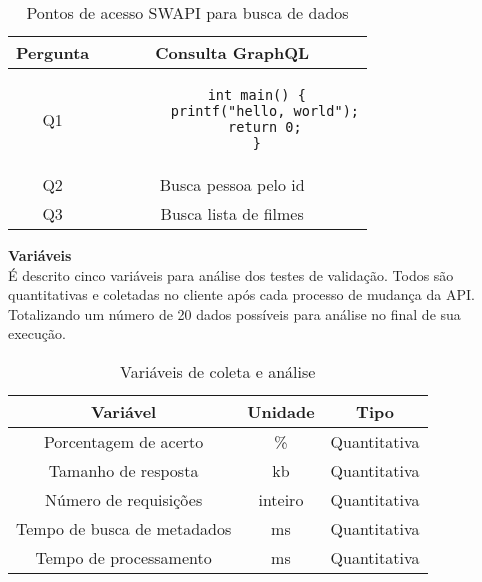\begin{table}[H]
  \centering
  \begin{tabular}{|c|c|}
    \hline
    Pergunta & Consulta GraphQL \\
    \hline
    Q1 & \begin{minipage}[t]{0.5\textwidth}
      \begin{verbatim}
      int main() {
        printf("hello, world");
        return 0;
      }
      \end{verbatim}
    \end{minipage} \\
    \hline
    Q2 & Busca pessoa pelo id \\
    \hline
    Q3 & Busca lista de filmes \\
    \hline
  \end{tabular}
  \caption{Pontos de acesso SWAPI para busca de dados}
\end{table}

\textbf{Variáveis} \\

É descrito cinco variáveis para análise dos testes de validação. Todos são quantitativas e coletadas no cliente após cada processo de mudança da API. Totalizando um número de 20 dados possíveis para análise no final de sua execução.

\begin{table}[H]
  \centering
  \begin{tabular}{|c|c|c|}
    \hline
    Variável & Unidade & Tipo \\
    \hline
    Porcentagem de acerto & \% & Quantitativa \\
    \hline
    Tamanho de resposta & kb & Quantitativa \\
    \hline
    Número de requisições & inteiro & Quantitativa \\
    \hline
    Tempo de busca de metadados & ms & Quantitativa \\
    \hline
    Tempo de processamento & ms & Quantitativa \\
    \hline
  \end{tabular}
  \caption{Variáveis de coleta e análise}
\end{table}

 
 
 
 
 
 

 
